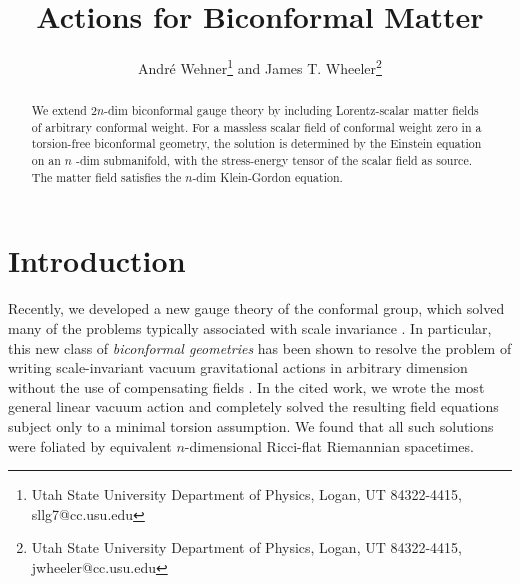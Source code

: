 \documentclass[a4paper,a4paper]{article}
\begin{document}
\title{Actions for Biconformal Matter}
\author{Andr\'{e} Wehner\footnote{Utah State University Department of Physics, Logan, UT 84322-4415, sllg7@cc.usu.edu}  and James T. Wheeler\footnote{Utah State University Department of Physics, Logan, UT 84322-4415, jwheeler@cc.usu.edu}}
\maketitle

\begin{abstract}
We extend $2n$-dim biconformal gauge theory by including
Lorentz-scalar matter fields of arbitrary conformal weight. For a massless
scalar field of conformal weight zero in a torsion-free biconformal
geometry, the solution is determined by the Einstein equation on an $n$%
-dim submanifold, with the stress-energy tensor of the scalar field
as source. The matter field satisfies the $n$-dim Klein-Gordon
equation.
\end{abstract}

\section{Introduction}

Recently, we developed a new gauge theory of the conformal group, which
solved many of the problems typically associated with scale invariance \cite
{New Conformal Gauging Paper}. In particular, this new class of \textit{%
biconformal geometries} has been shown to resolve the problem of writing
scale-invariant vacuum gravitational actions in arbitrary dimension without
the use of compensating fields \cite{WW}. In the cited work, we wrote the
most general linear vacuum action and completely solved the resulting field
equations subject only to a minimal torsion assumption. We found that all
such solutions were foliated by equivalent $n$-dimensional Ricci-flat
Riemannian spacetimes.
\end{document}

